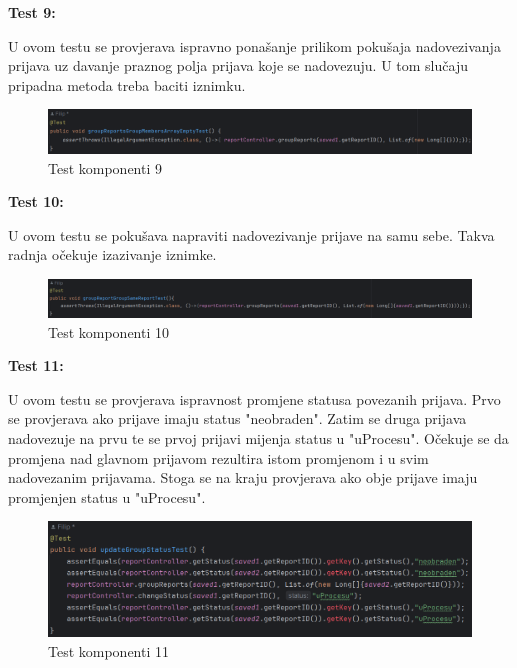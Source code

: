 			\textbf{Test 9:}
			
			U ovom testu se provjerava ispravno ponašanje prilikom pokušaja nadovezivanja prijava uz davanje praznog polja prijava koje se nadovezuju. U tom slučaju pripadna metoda treba baciti iznimku.
			
			\begin{figure}[H]
				\includegraphics[width=\textwidth]{slike/JUnitTest9.png} %
				\caption{Test komponenti 9}
				\label{fig:JUnitTest9} %
			\end{figure}
			
			\textbf{Test 10:}
			
			U ovom testu se pokušava napraviti nadovezivanje prijave na samu sebe. Takva radnja očekuje izazivanje iznimke.
			
			\begin{figure}[H]
				\includegraphics[width=\textwidth]{slike/JUnitTest10.png} %
				\caption{Test komponenti 10}
				\label{fig:JUnitTest10} %
			\end{figure}
			
			\textbf{Test 11:}
			
			U ovom testu se provjerava ispravnost promjene statusa povezanih prijava. Prvo se provjerava ako prijave imaju status "neobraden". Zatim se druga prijava nadovezuje na prvu te se prvoj prijavi mijenja status u "uProcesu". Očekuje se da promjena nad glavnom prijavom rezultira istom promjenom i u svim nadovezanim prijavama. Stoga se na kraju provjerava ako obje prijave imaju promjenjen status u "uProcesu".
			
			\begin{figure}[H]
				\includegraphics[width=\textwidth]{slike/JUnitTest11.png} %
				\caption{Test komponenti 11}
				\label{fig:JUnitTest11} %
			\end{figure}
			
